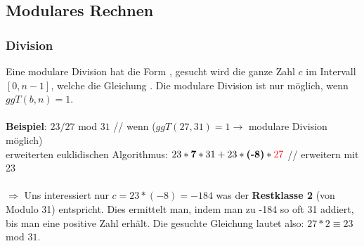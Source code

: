 \documentclass[10pt]{article}
\begin{document}
\subsection{Modulares Rechnen}
\subsubsection{Division}
Eine modulare Division hat die Form  , gesucht wird die ganze Zahl $c$ im Intervall $[0,n-1]$, welche die Gleichung . Die modulare Division ist nur möglich, wenn $ggT(b,n)=1$. \\
\\
\textbf{Beispiel}: $23/27$ mod $31$ {\color{gray} // wenn ($ggT(27,31) = 1 \rightarrow$  modulare Division möglich) }\\
erweiterten euklidischen Algorithmus: $23 * \textbf{7} * 31 + 23 * \textbf{(-8)} * {\color{red}27}$  {\color{gray}// erweitern mit 23}\\
\\
$\Longrightarrow$ Uns interessiert nur $c = 23 * (-8) = -184$ was der \textbf{Restklasse 2} (von Modulo 31) entspricht. Dies ermittelt man, indem man zu -184 so oft 31 addiert, bis man eine positive Zahl erhält. Die gesuchte Gleichung lautet also: $27 * 2 \equiv 23$ mod $31$.
\end{document}
